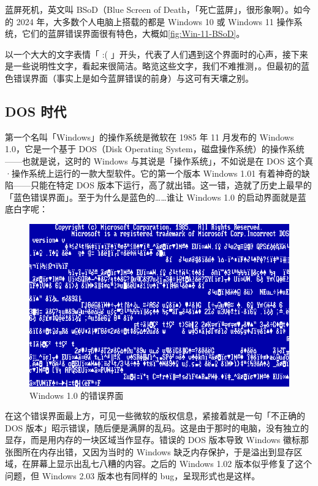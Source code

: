 蓝屏死机，英文叫 BSoD（Blue Screen of Death，「死亡蓝屏」，很形象啊）。如今的 2024 年，大多数个人电脑上搭载的都是 Windows 10 或 Windows 11 操作系统，它们的蓝屏错误界面很有特色，大概如\autoref{fig:Win-11-BSoD}。

以一个大大的文字表情「 :( 」开头，代表了人们遇到这个界面时的心声，接下来是一些说明性文字，看起来很简洁。略览这些文字，我们不难推测，。但最初的蓝色错误界面（事实上是如今蓝屏错误的前身）与这可有天壤之别。

\subsection{DOS 时代}

第一个名叫「Windows」的操作系统是微软在 1985 年 11 月发布的 Windows 1.0，它是一个基于 DOS（Disk Operating System，磁盘操作系统）的操作系统——也就是说，这时的 Windows 与其说是「操作系统」，不如说是在 DOS 这个真·操作系统上运行的一款大型软件。它的第一个版本 Windows 1.01 有着神奇的缺陷——只能在特定 DOS 版本下运行，高了就出错。这一错，造就了历史上最早的「蓝色错误界面」。至于为什么是蓝色的……谁让 Windows 1.0 的启动界面就是蓝底白字呢：

\begin{figure}[htb!]
  \centering
  \includegraphics[width=.7\textwidth]{assets/advanced/Win-1.0-Error.png}
  \caption{Windows 1.0 的错误界面}
  \label{fig:Win-1.0-Error}
\end{figure}

在这个错误界面最上方，可见一些微软的版权信息，紧接着就是一句「不正确的 DOS 版本」昭示错误，随后便是满屏的乱码。这是由于那时的电脑，没有独立的显存，而是用内存的一块区域当作显存。错误的 DOS 版本导致 Windows 徽标那张图所在内存出错，又因为当时的 Windows 缺乏内存保护，于是溢出到显存区域，在屏幕上显示出乱七八糟的内容。之后的 Windows 1.02 版本似乎修复了这个问题，但 Windows 2.03 版本也有同样的 bug，呈现形式也是这样。

